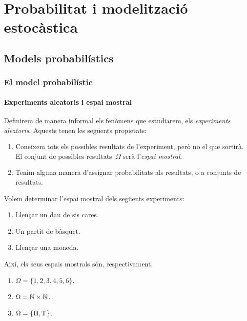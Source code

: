 \documentclass[../Apunts.tex]{subfiles}
\begin{document}
\part{Probabilitat i modelització estocàstica}
\chapter{Models probabilístics}
\section{El model probabilístic}
\subsection{Experiments aleatoris i espai mostral}
	\begin{definition}
		\label{def:experiment aleatori}
		\label{def:espai mostral}
		Definirem de manera informal els fenòmens que estudiarem, els \emph{experiments aleatoris}. Aquests tenen les següents propietats:
		\begin{enumerate}
			\item Coneixem tots els possibles resultats de l'experiment, però no el que sortirà. El conjunt de possibles resultats~\(\Omega\) serà l'\emph{espai mostral}.
			\item Tenim alguna manera d'assignar probabilitats als resultats, o a conjunts de resultats.
		\end{enumerate}
	\end{definition}
	\begin{example}
		\label{ex:espais mostrals}
		Volem determinar l'espai mostral dels següents experiments:
		\begin{enumerate}
			\item\label{ex:espais mostrals:eq1} Llençar un dau de sis cares.
			\item\label{ex:espais mostrals:eq2} Un partit de bàsquet.
			\item\label{ex:espais mostrals:eq3} Llençar una moneda.
		\end{enumerate}
		\begin{solution}
			Així, els seus espais mostrals són, respectivament,
			\begin{enumerate}
				\item \(\Omega=\{1,2,3,4,5,6\}\).
				\item \(\Omega=\mathbb{N}\times\mathbb{N}\).
				\item \(\Omega=\{\mathrm{H},\mathrm{T}\}\).\qedhere
			\end{enumerate}
		\end{solution}
	\end{example}
\end{document}

